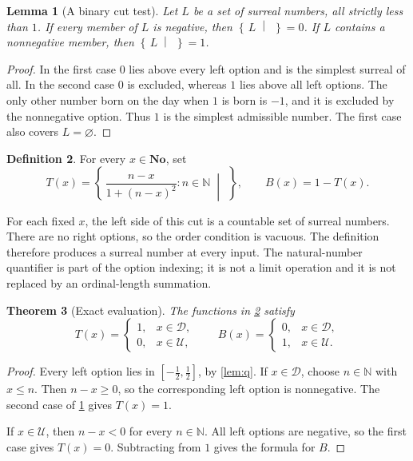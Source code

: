 \documentclass[11pt,letterpaper]{article}
\numberwithin{equation}{section}
\newtheorem{theorem}{Theorem}[section]
\newtheorem{lemma}[theorem]{Lemma}
\theoremstyle{definition}
\newtheorem{definition}[theorem]{Definition}
\theoremstyle{remark}
\newcommand{\No}{\mathbf{No}}
\newcommand{\N}{\mathbb{N}}
\newcommand{\U}{\mathcal{U}}
\newcommand{\D}{\mathcal{D}}
\newcommand{\cut}[2]{\left\{\,#1\;\middle|\;#2\,\right\}}
\begin{document}
\begin{lemma}[A binary cut test]\label{lem:binary}
Let $L$ be a set of surreal numbers, all strictly less than $1$. If every
member of $L$ is negative, then $\cut{L}{}=0$. If $L$ contains a nonnegative
member, then $\cut{L}{}=1$.
\end{lemma}
\begin{proof}
In the first case $0$ lies above every left option and is the simplest
surreal of all. In the second case $0$ is excluded, whereas $1$ lies above
all left options. The only other number born on the day when $1$ is born
is $-1$, and it is excluded by the nonnegative option. Thus $1$ is the
simplest admissible number. The first case also covers $L=\varnothing$.
\end{proof}

\begin{definition}\label{def:T}
For every $x\in\No$, set
\begin{equation}\label{eq:T}
 T(x)=\cut{\frac{n-x}{1+(n-x)^2}:n\in\N}{},\qquad B(x)=1-T(x).
\end{equation}
\end{definition}

For each fixed $x$, the left side of this cut is a countable set of surreal
numbers. There are no right options, so the order condition is vacuous.
The definition therefore produces a surreal number at every input. The
natural-number quantifier is part of the option indexing; it is not a
limit operation and it is not replaced by an ordinal-length summation.

\begin{theorem}[Exact evaluation]\label{thm:evaluation}
The functions in \cref{def:T} satisfy
\begin{equation}\label{eq:values}
 T(x)=
 \begin{cases}1,&x\in\D,\\0,&x\in\U,\end{cases}
 \qquad
 B(x)=
 \begin{cases}0,&x\in\D,\\1,&x\in\U.\end{cases}
\end{equation}
\end{theorem}
\begin{proof}
Every left option lies in $[-\tfrac12,\tfrac12]$, by \cref{lem:q}.
If $x\in\D$, choose $n\in\N$ with $x\le n$. Then $n-x\ge0$, so the
corresponding left option is nonnegative. The second case of
\cref{lem:binary} gives $T(x)=1$.

If $x\in\U$, then $n-x<0$ for every $n\in\N$. All left options are
negative, so the first case gives $T(x)=0$. Subtracting from $1$ gives the
formula for $B$.
\end{proof}
\end{document}
